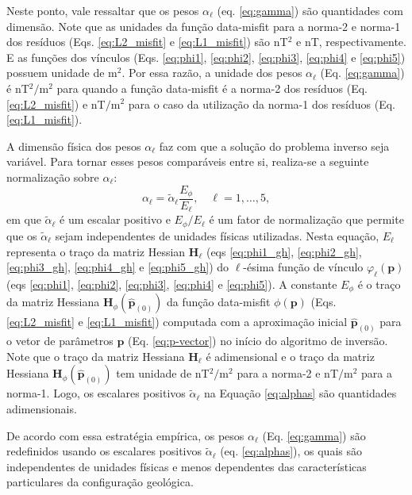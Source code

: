 Neste ponto, vale ressaltar que os pesos $ \alpha_{\ell}$ (eq. \ref{eq:gamma}) são quantidades com dimensão.
Note que as unidades da função data-misfit para a norma-2 e norma-1 dos resíduos (Eqs. \ref{eq:L2_misfit} e \ref{eq:L1_misfit}) são nT$^2$ e nT, respectivamente.
E as funções dos vínculos (Eqs. \ref{eq:phi1}, \ref{eq:phi2}, \ref{eq:phi3}, \ref{eq:phi4} e \ref{eq:phi5}) possuem unidade de m$^2$.
Por essa razão, a unidade dos pesos $ \alpha_{\ell} $ (Eq. \ref{eq:gamma}) é nT$^{2}/$m$^{2}$ para quando a função data-misfit é a norma-2 dos resíduos (Eq. \ref{eq:L2_misfit}) e nT$/$m$^{2}$ para o caso da utilização da norma-1 dos resíduos (Eq. \ref{eq:L1_misfit}).

A dimensão física dos pesos $ \alpha_{\ell}$ faz com que a solução do problema inverso seja variável.
Para tornar esses pesos comparáveis entre si, realiza-se a seguinte normalização sobre $ \alpha_{\ell} $:
\begin{equation}\label{eq:alphas}
\alpha_{\ell} = \tilde{\alpha}_\ell \frac{E_\phi}{E_\ell}, \quad \ell = 1,\dots, 5,
\end{equation}
em que $\tilde{\alpha}_\ell$ é um escalar positivo e $ E_\phi/E_\ell $ é um fator de normalização que permite que os $\tilde{\alpha}_\ell$ sejam independentes de unidades físicas utilizadas.
Nesta equação, $ E_\ell $ representa o traço da matriz Hessian $\mathbf{H}_{\ell}$ (eqs \ref{eq:phi1_gh}, \ref{eq:phi2_gh}, \ref{eq:phi3_gh}, \ref{eq:phi4_gh} e \ref{eq:phi5_gh}) do $ \ell $-ésima função de vínculo $\varphi_{\ell}(\mathbf{p})$ (eqs \ref{eq:phi1}, \ref{eq:phi2}, \ref{eq:phi3}, 
\ref{eq:phi4} e \ref{eq:phi5}).
A constante $E_\phi$ é o traço da matriz Hessiana $\mathbf{H}_{\phi}(\hat{\mathbf{p}}_{(0)})$ da função data-misfit $\phi(\mathbf{p})$ (Eqs. \ref{eq:L2_misfit} e \ref{eq:L1_misfit}) computada com a aproximação inicial $\hat{\mathbf{p}}_{(0)}$ para o vetor de parâmetros $ \mathbf{p} $ (Eq. \ref{eq:p-vector}) no início do algoritmo de inversão.
Note que o traço da matriz Hessiana $\mathbf{H}_{\ell}$ é adimensional e o traço da matriz Hessiana $\mathbf{H}_{\phi}(\hat{\mathbf{p}}_{(0)})$ tem unidade de nT$^{2}/$m$^{2}$ para a norma-2 e nT$ / $m$ ^2 $ para a norma-1.
Logo, os escalares positivos $\tilde{\alpha}_\ell$ na Equação \ref{eq:alphas} são quantidades adimensionais.

De acordo com essa estratégia empírica, os pesos $ \alpha_{\ell} $ 
(Eq. \ref{eq:gamma}) são redefinidos usando os escalares positivos $\tilde{\alpha}_\ell$ (eq. \ref{eq:alphas}), os quais são independentes de unidades físicas e menos dependentes das características particulares da configuração geológica.

